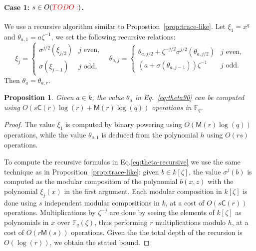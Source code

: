 \documentclass[12pt]{article}
\theoremstyle{plain}
\newtheorem{proposition}[theorem]{Proposition}
\theoremstyle{definition}
\newcommand{\todo}[1]{\textcolor{red}{TODO: #1}}
\def\F{\ensuremath{\mathbb{F}}}
\def\MM{\ensuremath{\mathsf{M}}}
\def\CC{\ensuremath{\mathsf{C}}}
\newcounter{algorithm}
\begin{document}
\paragraph{Case 1: $s\in O(\todo{})$.}
We use a recursive algorithm similar to Propostion~\ref{prop:trace-like}.
Let $\xi_1=x^q$ and $\theta_{a,1}=a\zeta^{-1}$,
we set the following recursive relations:
\begin{equation}
\label{eq:theta-recursive}
\xi_j = 
\begin{cases}
\sigma^{j/2}(\xi_{j / 2}) & j \text{ even,} \\
\sigma(\xi_{j - 1}) & j \text{ odd,}
\end{cases} \quad
\theta_{a, j} = 
\begin{cases}
\theta_{a, j / 2} + \zeta^{-j / 2}\sigma^{j / 2}(\theta_{a, j / 2})& j \text{ even,} \\
(a + \sigma(\theta_{a, j - 1}))\zeta^{-1} & j \text{ odd.}
\end{cases}
\end{equation}
Then $\theta_a=\theta_{a,r}$.

\begin{proposition}
  \label{prop:xitheta}
  Given $a\in k$, the value $\theta_a$ in Eq.~\eqref{eq:theta90} can
  be computed using $O(s\CC(r)\log(r)+\MM(r)\log(q))$ operations in
  $\F_q$.
\end{proposition}
\begin{proof}
  The value $\xi_1$ is computed by binary powering using
  $O(\MM(r)\log(q))$ operations, while the value $\theta_{a,1}$ is
  deduced from the polynomial $h$ using $O(rs)$ operations.
  
  To compute the recursive formulas in Eq.\eqref{eq:theta-recursive}
  we use the same technique as in Proposition~\ref{prop:trace-like}:
  given $b \in k[\zeta]$, the value $\sigma^j(b)$ is computed as the
  modular composition of the polynomial $b(x,z)$ with the polynomial
  $\xi_j(x)$ in the first argument. %
  Each modular composition in $k[\zeta]$ is done using $s$ independent
  modular compositions in $k$, at a cost of $O(s\CC(r))$ operations. %
  Multiplications by $\zeta^{-j}$ are done by seeing the elements of
  $k[\zeta]$ as polynomials in $x$ over $\F_q(\zeta)$, thus performing
  $r$ multiplications modulo $h$, at a cost of $O(r\MM(s))$
  operations. %
  Given the the total depth of the recursion is $O(\log(r))$, we
  obtain the stated bound.
\end{proof}
\end{document}

